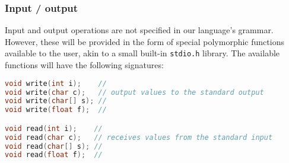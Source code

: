\subsubsection{Input / output}
Input and output operations are not specified in our language's grammar. However, these will be provided
in the form of special polymorphic functions available to the user, akin to a small built-in
\texttt{stdio.h} library. The available functions will have the following signatures:

\begin{lstlisting}[language=C]
void write(int i);    //
void write(char c);   // output values to the standard output
void write(char[] s); //
void write(float f);  //

void read(int i);    //
void read(char c);   // receives values from the standard input
void read(char[] s); //
void read(float f);  //
\end{lstlisting}
